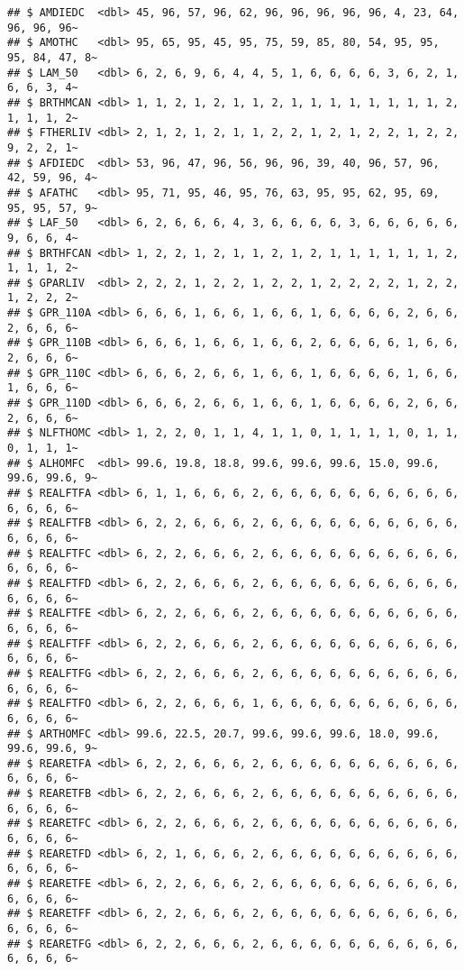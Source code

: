 \documentclass[
]{article}
\begin{document}
\begin{verbatim}
## $ AMDIEDC  <dbl> 45, 96, 57, 96, 62, 96, 96, 96, 96, 96, 4, 23, 64, 96, 96, 96~
## $ AMOTHC   <dbl> 95, 65, 95, 45, 95, 75, 59, 85, 80, 54, 95, 95, 95, 84, 47, 8~
## $ LAM_50   <dbl> 6, 2, 6, 9, 6, 4, 4, 5, 1, 6, 6, 6, 6, 3, 6, 2, 1, 6, 6, 3, 4~
## $ BRTHMCAN <dbl> 1, 1, 2, 1, 2, 1, 1, 2, 1, 1, 1, 1, 1, 1, 1, 1, 2, 1, 1, 1, 2~
## $ FTHERLIV <dbl> 2, 1, 2, 1, 2, 1, 1, 2, 2, 1, 2, 1, 2, 2, 1, 2, 2, 9, 2, 2, 1~
## $ AFDIEDC  <dbl> 53, 96, 47, 96, 56, 96, 96, 39, 40, 96, 57, 96, 42, 59, 96, 4~
## $ AFATHC   <dbl> 95, 71, 95, 46, 95, 76, 63, 95, 95, 62, 95, 69, 95, 95, 57, 9~
## $ LAF_50   <dbl> 6, 2, 6, 6, 6, 4, 3, 6, 6, 6, 6, 3, 6, 6, 6, 6, 6, 9, 6, 6, 4~
## $ BRTHFCAN <dbl> 1, 2, 2, 1, 2, 1, 1, 2, 1, 2, 1, 1, 1, 1, 1, 1, 2, 1, 1, 1, 2~
## $ GPARLIV  <dbl> 2, 2, 2, 1, 2, 2, 1, 2, 2, 1, 2, 2, 2, 2, 1, 2, 2, 1, 2, 2, 2~
## $ GPR_110A <dbl> 6, 6, 6, 1, 6, 6, 1, 6, 6, 1, 6, 6, 6, 6, 2, 6, 6, 2, 6, 6, 6~
## $ GPR_110B <dbl> 6, 6, 6, 1, 6, 6, 1, 6, 6, 2, 6, 6, 6, 6, 1, 6, 6, 2, 6, 6, 6~
## $ GPR_110C <dbl> 6, 6, 6, 2, 6, 6, 1, 6, 6, 1, 6, 6, 6, 6, 1, 6, 6, 1, 6, 6, 6~
## $ GPR_110D <dbl> 6, 6, 6, 2, 6, 6, 1, 6, 6, 1, 6, 6, 6, 6, 2, 6, 6, 2, 6, 6, 6~
## $ NLFTHOMC <dbl> 1, 2, 2, 0, 1, 1, 4, 1, 1, 0, 1, 1, 1, 1, 0, 1, 1, 0, 1, 1, 1~
## $ ALHOMFC  <dbl> 99.6, 19.8, 18.8, 99.6, 99.6, 99.6, 15.0, 99.6, 99.6, 99.6, 9~
## $ REALFTFA <dbl> 6, 1, 1, 6, 6, 6, 2, 6, 6, 6, 6, 6, 6, 6, 6, 6, 6, 6, 6, 6, 6~
## $ REALFTFB <dbl> 6, 2, 2, 6, 6, 6, 2, 6, 6, 6, 6, 6, 6, 6, 6, 6, 6, 6, 6, 6, 6~
## $ REALFTFC <dbl> 6, 2, 2, 6, 6, 6, 2, 6, 6, 6, 6, 6, 6, 6, 6, 6, 6, 6, 6, 6, 6~
## $ REALFTFD <dbl> 6, 2, 2, 6, 6, 6, 2, 6, 6, 6, 6, 6, 6, 6, 6, 6, 6, 6, 6, 6, 6~
## $ REALFTFE <dbl> 6, 2, 2, 6, 6, 6, 2, 6, 6, 6, 6, 6, 6, 6, 6, 6, 6, 6, 6, 6, 6~
## $ REALFTFF <dbl> 6, 2, 2, 6, 6, 6, 2, 6, 6, 6, 6, 6, 6, 6, 6, 6, 6, 6, 6, 6, 6~
## $ REALFTFG <dbl> 6, 2, 2, 6, 6, 6, 2, 6, 6, 6, 6, 6, 6, 6, 6, 6, 6, 6, 6, 6, 6~
## $ REALFTFO <dbl> 6, 2, 2, 6, 6, 6, 1, 6, 6, 6, 6, 6, 6, 6, 6, 6, 6, 6, 6, 6, 6~
## $ ARTHOMFC <dbl> 99.6, 22.5, 20.7, 99.6, 99.6, 99.6, 18.0, 99.6, 99.6, 99.6, 9~
## $ REARETFA <dbl> 6, 2, 2, 6, 6, 6, 2, 6, 6, 6, 6, 6, 6, 6, 6, 6, 6, 6, 6, 6, 6~
## $ REARETFB <dbl> 6, 2, 2, 6, 6, 6, 2, 6, 6, 6, 6, 6, 6, 6, 6, 6, 6, 6, 6, 6, 6~
## $ REARETFC <dbl> 6, 2, 2, 6, 6, 6, 2, 6, 6, 6, 6, 6, 6, 6, 6, 6, 6, 6, 6, 6, 6~
## $ REARETFD <dbl> 6, 2, 1, 6, 6, 6, 2, 6, 6, 6, 6, 6, 6, 6, 6, 6, 6, 6, 6, 6, 6~
## $ REARETFE <dbl> 6, 2, 2, 6, 6, 6, 2, 6, 6, 6, 6, 6, 6, 6, 6, 6, 6, 6, 6, 6, 6~
## $ REARETFF <dbl> 6, 2, 2, 6, 6, 6, 2, 6, 6, 6, 6, 6, 6, 6, 6, 6, 6, 6, 6, 6, 6~
## $ REARETFG <dbl> 6, 2, 2, 6, 6, 6, 2, 6, 6, 6, 6, 6, 6, 6, 6, 6, 6, 6, 6, 6, 6~

\end{verbatim}
\end{document}
